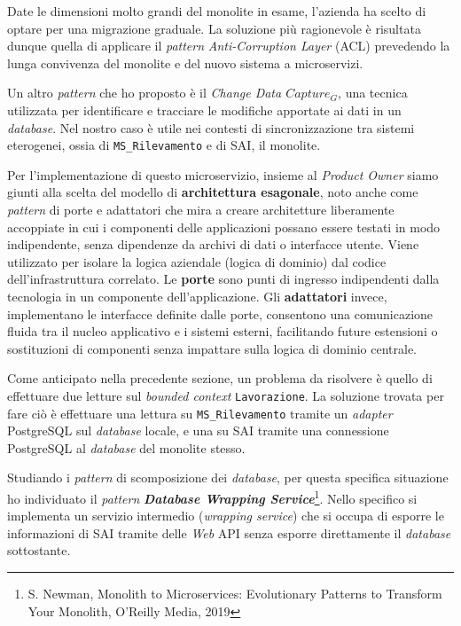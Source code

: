         \vspace{0.2 em}
        \noindent Date le dimensioni molto grandi del monolite in esame, l'azienda ha scelto di optare per una migrazione graduale. La soluzione più ragionevole è risultata dunque quella di applicare il \textit{pattern} \textit{Anti-Corruption Layer} (ACL) prevedendo la lunga convivenza del monolite e del nuovo sistema a microservizi. 

        \vspace{0.2 em}
        \noindent Un altro \textit{pattern} che ho proposto è il \textit{Change Data $Capture_G$}, una tecnica utilizzata per identificare e tracciare le modifiche apportate ai dati in un \textit{database}. Nel nostro caso è utile nei contesti di sincronizzazione tra sistemi eterogenei, ossia di \texttt{MS\_Rilevamento} e di SAI, il monolite. 

        \vspace{0.2em}
        \noindent Per l'implementazione di questo microservizio, insieme al \textit{Product Owner} siamo giunti alla scelta del modello di \textbf{architettura esagonale}, noto anche come \textit{pattern} di porte e adattatori che mira a creare architetture liberamente accoppiate in cui i componenti delle applicazioni possano essere testati in modo indipendente, senza dipendenze da archivi di dati o interfacce utente. Viene utilizzato per isolare la logica aziendale (logica di dominio) dal codice dell'infrastruttura correlato. Le \textbf{porte} sono punti di ingresso indipendenti dalla tecnologia in un componente dell'applicazione. Gli \textbf{adattatori} invece, implementano le interfacce definite dalle porte, consentono una comunicazione fluida tra il nucleo applicativo e i sistemi esterni, facilitando future estensioni o sostituzioni di componenti senza impattare sulla logica di dominio centrale.

        \vspace{0.2 em}
        \noindent Come anticipato nella precedente sezione, un problema da risolvere è quello di effettuare due letture sul \textit{bounded context} \texttt{Lavorazione}. La soluzione trovata per fare ciò è effettuare una lettura su \texttt{MS\_Rilevamento} tramite un \textit{adapter} PostgreSQL sul \textit{database} locale, e una su SAI tramite una connessione PostgreSQL al \textit{database} del monolite stesso. 
        
        \vspace{0.2 em}
        \noindent Studiando i \textit{pattern} di scomposizione dei \textit{database}, per questa specifica situazione ho individuato il \textit{pattern} \textbf{\textit{Database Wrapping Service}}\footnote{S. Newman, Monolith to Microservices: Evolutionary Patterns to Transform Your Monolith, O'Reilly Media, 2019}. Nello specifico si implementa un servizio intermedio (\textit{wrapping service}) che si occupa di esporre le informazioni di SAI tramite delle \textit{Web} API senza esporre direttamente il \textit{database} sottostante. 

